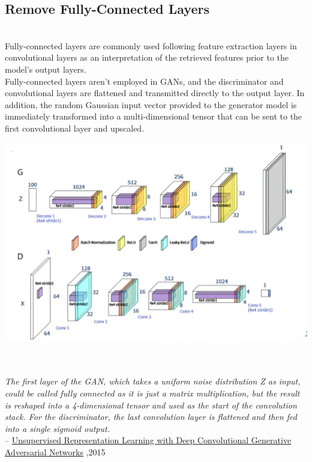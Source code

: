 \documentclass[14pt]{article}
\begin{document}
\subsection{Remove Fully-Connected Layers}
\\
Fully-connected layers are commonly used following feature extraction layers in convolutional layers as an interpretation of the retrieved features prior to the model's output layers.\\
Fully-connected layers aren't employed in GANs, and the discriminator and convolutional layers are flattened and transmitted directly to the output layer.
In addition, the random Gaussian input vector provided to the generator model is immediately transformed into a multi-dimensional tensor that can be sent to the first convolutional layer and upscaled.\\ 
\begin{center}
    \includegraphics[width = 12 cm ]{fully.png}
\end{center} \\ \\
\hspace*{1cm} \textit{The first layer of the GAN, which takes a uniform noise distribution Z as input, could be called fully connected as it is just a matrix multiplication, but the result is reshaped into a 4-dimensional tensor and used as the start of the convolution stack. For the discriminator, the last convolution layer is flattened and then fed into a single sigmoid output.}
\\
\hspace*{4cm} --
\hyperlink{https://arxiv.org/abs/1511.06434}{Unsupervised Representation Learning with Deep Convolutional Generative Adversarial Networks} ,2015
\\
\end{document}
